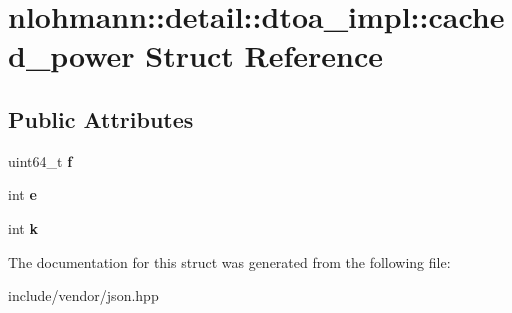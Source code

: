 \hypertarget{structnlohmann_1_1detail_1_1dtoa__impl_1_1cached__power}{}\section{nlohmann\+:\+:detail\+:\+:dtoa\+\_\+impl\+:\+:cached\+\_\+power Struct Reference}
\label{structnlohmann_1_1detail_1_1dtoa__impl_1_1cached__power}
\subsection*{Public Attributes}
\begin{DoxyCompactItemize}
\item 
\mbox{\label{structnlohmann_1_1detail_1_1dtoa__impl_1_1cached__power_a56a47ff88dce47986dd938f2ccb2abbf}} 
uint64\+\_\+t {\bfseries f}
\item 
\mbox{\label{structnlohmann_1_1detail_1_1dtoa__impl_1_1cached__power_a9e89bc89bb7bf4361f43ea27eed91d23}} 
int {\bfseries e}
\item 
\mbox{\label{structnlohmann_1_1detail_1_1dtoa__impl_1_1cached__power_a8c1f2efed643eeaa8fae83c697a29c6a}} 
int {\bfseries k}
\end{DoxyCompactItemize}


The documentation for this struct was generated from the following file\+:\begin{DoxyCompactItemize}
\item 
include/vendor/json.\+hpp\end{DoxyCompactItemize}

